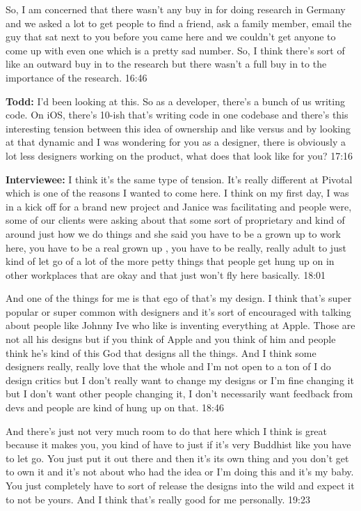 So, I am concerned that there wasn't any buy in for doing research in Germany and we asked a lot to get people to find a friend, ask a family member, email the guy that sat next to you before you came here and we couldn't get anyone to come up with even one which is a pretty sad number.  So, I think there's sort of like an outward buy in to the research but there wasn't a full buy in to the importance of the research.  16:46

\textbf{Todd:} I'd been looking at this.  So as a developer, there's a bunch of us writing code.  On iOS, there's 10-ish that's writing code in one codebase and there's this interesting tension between this idea of ownership and like  versus  and by looking at that dynamic and I was wondering for you as a designer, there is obviously a lot less designers working on the product, what does that look like for you?  17:16

\textbf{Interviewee:} I think it's the same type of tension.  It's really different at Pivotal which is one of the reasons I wanted to come here.  I think on my first day, I was in a kick off for a brand new project and Janice was facilitating and people were, some of our clients were asking about that some sort of proprietary and kind of around just how we do things and she said you have to be a grown up to work here, you have to be a real grown up , you have to be really, really adult to just kind of let go of a lot of the more petty things that people get hung up on in other workplaces that are okay and that just won't fly here basically.  18:01

And one of the things for me is that ego of that's my design.  I think that's super popular or super common with designers and it's sort of encouraged with talking about people like Johnny Ive who like is inventing everything at Apple.  Those are not all his designs but if you think of Apple and you think of him and people think he's kind of this God that designs all the things.  And I think some designers really, really love that the whole  and I'm not open to a ton of I do design critics but I don't really want to change my designs or I'm fine changing it but I don't want other people changing it, I don't necessarily want feedback from devs and people are kind of hung up on that.  18:46

And there's just not very much room to do that here which I think is great because it makes you, you kind of have to just if it's very Buddhist like you have to let go.  You just put it out there and then it's its own thing and you don't get to own it and it's not about who had the idea or I'm doing this and it's my baby.   You just completely have to sort of release the designs into the wild and expect it to not be yours.  And I think that's really good for me personally.  19:23

